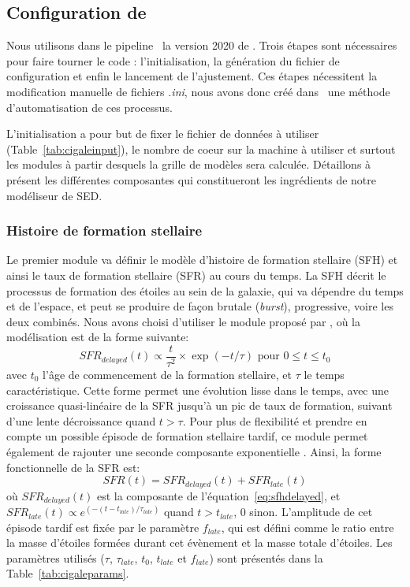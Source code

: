 \documentclass[../main/main.tex]{subfiles}
\begin{document}
\subsection{Configuration de }
\label{ssec:cigaleconfig}



Nous utilisons dans le pipeline \hypergal\ la version 2020 de
\cigale. Trois étapes sont nécessaires pour faire tourner le code :
l'initialisation, la génération du fichier de configuration et enfin le
lancement de l'ajustement. Ces étapes nécessitent la modification manuelle de
fichiers \textit{.ini}, nous avons donc créé dans \hypergal\ une méthode d'automatisation de ces processus.

L'initialisation a pour but de fixer le fichier de données à utiliser
(Table~\ref{tab:cigaleinput}), le nombre de coeur sur la machine à
utiliser et surtout les modules à partir desquels la grille de modèles
sera calculée. Détaillons à présent les différentes composantes qui constitueront les ingrédients de notre modéliseur de SED.

\subsubsection{Histoire de formation stellaire}

Le premier module va définir le modèle d'histoire de formation stellaire
(SFH) et ainsi le taux de formation stellaire (SFR) au cours du
temps. La SFH décrit le processus de formation des étoiles au sein de la
galaxie, qui va dépendre du temps et de l'espace, et peut se produire de
façon brutale (\textit{burst}), progressive, voire les deux
combinés. Nous avons choisi d'utiliser le module
\textbf{} proposé par \cigale, où la modélisation est de la forme suivante:
\begin{equation}
  \label{eq:sfhdelayed}
  SFR_{delayed}(t)\propto \frac{t}{\tau^2}\times\exp(-t/\tau) \text{ pour $0\le t\le t_0$}
\end{equation}
avec $t_0$ l'âge de commencement de la formation stellaire, et $\tau$ le
temps caractéristique. Cette forme permet une évolution lisse dans le
temps, avec une croissance quasi-linéaire de la SFR jusqu'à un pic de
taux de formation, suivant d'une lente décroissance quand $t>\tau$.
Pour plus de flexibilité et prendre en compte un possible épisode de
formation stellaire tardif, ce module permet également de rajouter une
seconde composante exponentielle \citep{Malek2018}.
Ainsi, la forme fonctionnelle de la SFR est:
\begin{equation}
  \label{eq:sfhdelayedburst}
  SFR(t) = SFR_{delayed}(t) + SFR_{late}(t)
\end{equation}
où $SFR_{delayed}(t)$ est la composante de
l'équation~\ref{eq:sfhdelayed}, et $SFR_{late}(t)\propto
e^{(-(t-t_{late})/\tau_{late})}$ quand $t>t_{late}$, $0$
sinon. L'amplitude de cet épisode tardif est fixée par le paramètre
$f_{late}$, qui est défini comme le ratio entre la masse d'étoiles
formées durant cet évènement et la masse totale d'étoiles. Les
paramètres utilisés ($\tau$, $\tau_{late}$, $t_0$, $t_{late}$ et
$f_{late}$) sont présentés dans la Table~\ref{tab:cigaleparams}.
\end{document}
